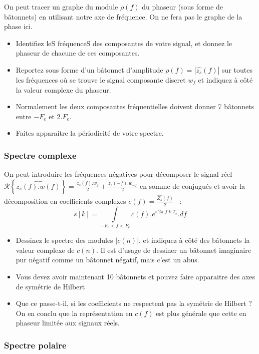 \documentclass[a4paper,twoside,12pt]{report}           %
\begin{document}
 On peut tracer un graphe du module $\rho(f)$ du phaseur (sous forme
 de bâtonnets) en utilisant notre axe de fréquence. On ne fera pas le
 graphe de la phase ici.
 \begin{itemize}
 \item Identifiez leS fréquenceS des composantes de votre signal, et
   donnez le phaseur de chacune de ces composantes.
 \item Reportez sous forme d'un bâtonnet d'amplitude
   $\rho(f)=|\hat{z_s}(f)|$ sur toutes les fréquences où se trouve le
   signal composante discret $w_f$ et indiquez à côté la valeur
   complexe du phaseur.

 \item Normalement les deux composantes fréquentielles doivent donner
   7 bâtonnets entre $-F_e$ et $2.F_e$.
 \item Faites apparaitre la périodicité de votre spectre.
 \end{itemize}


 \subsubsection{Spectre complexe}
 On peut introduire les fréquences négatives pour décomposer le signal
 réel
 $\mathcal{R}\left\{\hat{z_s(f).w(f)}\right\}=
 \frac{z_s(f).w_f}{2}+\frac{z_s(-f).w_{-f}}{2}$ en somme de conjugués
 et avoir la décomposition en coefficients complexes
 $c(f)=\frac{\widehat{Z_s}(f)}{2}$ ~:
 \begin{equation}
   \label{eq:itfsd_cn}
   s[k] = \int\limits_{-F_e < f < F_e}{c(f).e^{i.2\pi.f.k.T_e}.df}
 \end{equation}
 
 \begin{itemize}
 \item Dessinez le spectre des modules $|c(n)|$. et indiquez à côté
   des bâtonnets la valeur complexe de $c(n)$. Il est d'usage de
   dessiner un bâtonnet imaginaire pur négatif comme un bâtonnet
   négatif, mais c'est un abus.
 \item Vous devez avoir maintenant 10 bâtonnets et pouvez faire
   apparaitre des axes de symétrie de Hilbert
 \item Que ce passe-t-il, si les coefficients ne respectent pas la
   symétrie de Hilbert ? On en conclu que la représentation en $c(f)$
   est plus générale que cette en phaseur limitée aux signaux réels.
 \end{itemize}

 
 \subsubsection{Spectre polaire}
\end{document}
